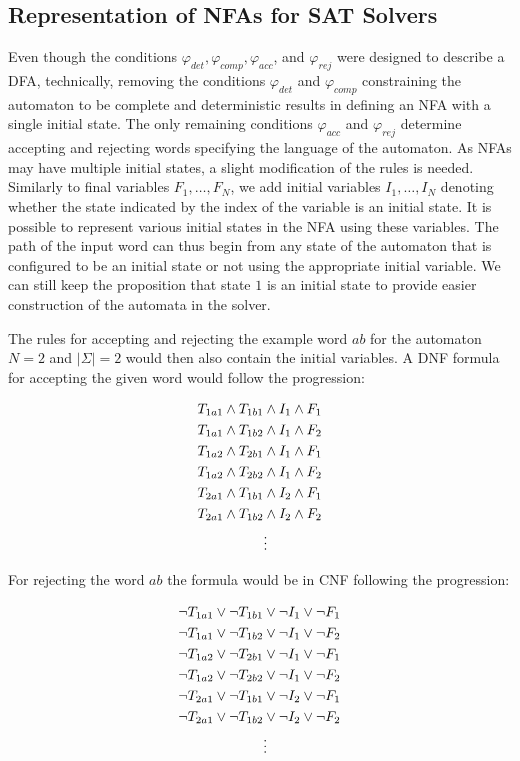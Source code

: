 \subsection{Representation of NFAs for SAT Solvers}
\label{subsec:NFA per for SAT}
Even though the conditions $\varphi_{det},\varphi_{comp}, \varphi_{acc}$, and $\varphi_{rej}$ were designed to describe a DFA, technically, removing the conditions $\varphi_{det}$ and $\varphi_{comp}$ constraining the automaton to be complete and deterministic results in defining an NFA with a single initial state. The only remaining conditions $\varphi_{acc}$ and $\varphi_{rej}$ determine accepting and rejecting words specifying the language of the automaton. As NFAs may have multiple initial states, a slight modification of the rules is needed. Similarly to final variables ${F_1,\dots, F_N}$, we add initial variables ${I_1,\dots, I_N}$ denoting whether the state indicated by the index of the variable is an initial state. It is possible to represent various initial states in the NFA using these variables. The path of the input word can thus begin from any state of the automaton that is configured to be an initial state or not using the appropriate initial variable. We can still keep the proposition that state $1$ is an initial state to provide easier construction of the automata in the solver.

The rules for accepting and rejecting the example word $ab$ for the automaton $N=2$ and $|\Sigma|=2$ would then also contain the initial variables. A DNF formula for accepting the given word would follow the progression:

\begin{align*}
    \centering
    T_{1a1} \land T_{1b1} &\land  I_1 \land F_1 \\
    T_{1a1} \land T_{1b2} &\land  I_1 \land F_2 \\
    T_{1a2} \land T_{2b1} &\land  I_1 \land F_1 \\
    T_{1a2} \land T_{2b2} &\land  I_1 \land F_2 \\
    T_{2a1} \land T_{1b1} &\land  I_2 \land F_1 \\
    T_{2a1} \land T_{1b2} &\land  I_2 \land F_2 \\
    & \vdots \notag
\end{align*}

 For rejecting the word $ab$ the formula would be in CNF following the progression:

\begin{align*}
    \centering
    \neg T_{1a1} \lor \neg T_{1b1} &\lor \neg I_1 \lor \neg F_1 \\
    \neg T_{1a1} \lor \neg T_{1b2} &\lor \neg I_1 \lor \neg F_2 \\
    \neg T_{1a2} \lor \neg T_{2b1} &\lor \neg I_1 \lor \neg F_1 \\
    \neg T_{1a2} \lor \neg T_{2b2} &\lor \neg I_1 \lor \neg F_2 \\
    \neg T_{2a1} \lor \neg T_{1b1} &\lor \neg I_2 \lor \neg F_1 \\
    \neg T_{2a1} \lor \neg T_{1b2} &\lor \neg I_2 \lor \neg F_2 \\
    & \vdots \notag
\end{align*}

